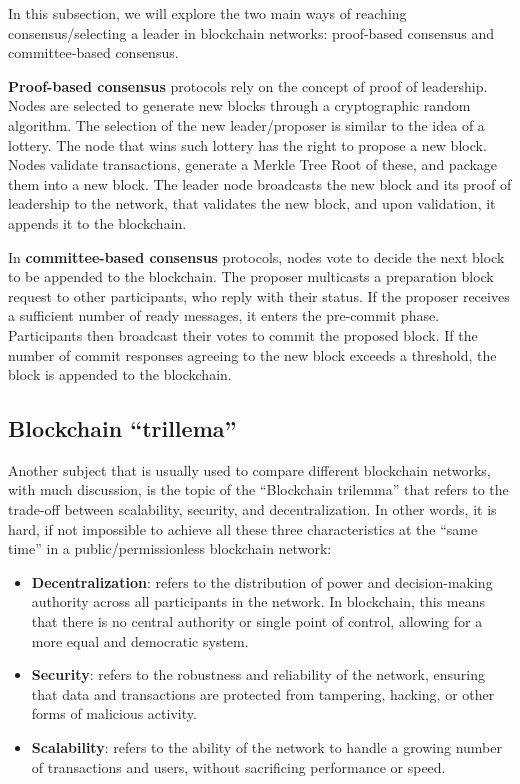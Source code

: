 In this subsection, we will explore the two main ways of reaching consensus/selecting a leader in blockchain networks: proof-based consensus and committee-based consensus.

\textbf{Proof-based consensus} protocols rely on the concept of proof of leadership. Nodes are selected to generate new blocks through a cryptographic random algorithm. The selection of the new leader/proposer is similar to the idea of a lottery. The node that wins such lottery has the right to propose a new block.
Nodes validate transactions, generate a Merkle Tree Root of these, and package them into a new block. The leader node broadcasts the new block and its proof of leadership to the network, that validates the new block, and upon validation, it appends it to the blockchain.

In \textbf{committee-based consensus} protocols, nodes vote to decide the next block to be appended to the blockchain. The proposer multicasts a preparation block request to other participants, who reply with their status. If the proposer receives a sufficient number of ready messages, it enters the pre-commit phase. Participants then broadcast their votes to commit the proposed block. If the number of commit responses agreeing to the new block exceeds a threshold, the block is appended to the blockchain.

\subsection*{Blockchain ``trillema''}

Another subject that is usually used to compare different blockchain networks, with much discussion, is the topic of the ``Blockchain trilemma'' \cite{buterin} that refers to the trade-off between scalability, security, and decentralization. 
In other words, it is hard, if not impossible to achieve all these three characteristics at the ``same time'' in a public/permissionless blockchain network:
\begin{itemize}
    \item \textbf{Decentralization}: refers to the distribution of power and decision-making authority across all participants in the network. In blockchain, this means that there is no central authority or single point of control, allowing for a more equal and democratic system.
    \item \textbf{Security}: refers to the robustness and reliability of the network, ensuring that data and transactions are protected from tampering, hacking, or other forms of malicious activity.
    \item \textbf{Scalability}: refers to the ability of the network to handle a growing number of transactions and users, without sacrificing performance or speed.
\end{itemize}

